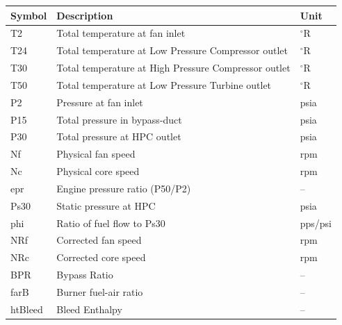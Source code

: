 \begin{table}[ht]
    \begin{tabular}{ p{2.2cm}  p{9cm}  p{1.3cm} }
        \hline
        \textbf{Symbol} & \textbf{Description}                                 & \textbf{Unit} \\
        \hline
        T2              & Total temperature at fan inlet                       & $^{\circ}$R   \\
        T24             & Total temperature at Low Pressure Compressor outlet  & $^{\circ}$R   \\
        T30             & Total temperature at High Pressure Compressor outlet & $^{\circ}$R   \\
        T50             & Total temperature at Low Pressure Turbine outlet     & $^{\circ}$R   \\
        P2              & Pressure at fan inlet                                & psia          \\
        P15             & Total pressure in bypass-duct                        & psia          \\
        P30             & Total pressure at HPC outlet                         & psia          \\
        Nf              & Physical fan speed                                   & rpm           \\
        Nc              & Physical core speed                                  & rpm           \\
        epr             & Engine pressure ratio (P50/P2)                       & --            \\
        Ps30            & Static pressure at HPC                               & psia          \\
        phi             & Ratio of fuel flow to Ps30                           & pps/psi       \\
        NRf             & Corrected fan speed                                  & rpm           \\
        NRc             & Corrected core speed                                 & rpm           \\
        BPR             & Bypass Ratio                                         & --            \\
        farB            & Burner fuel-air ratio                                & --            \\
        htBleed         & Bleed Enthalpy                                       & --            \\

\end{tabular}
\end{table}
